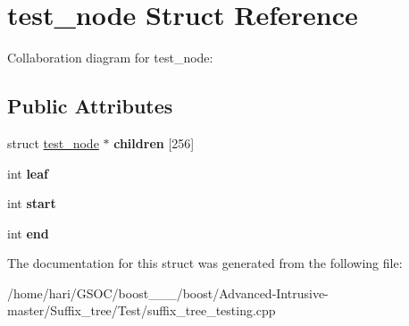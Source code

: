 \hypertarget{structtest__node}{}\section{test\+\_\+node Struct Reference}
\label{structtest__node}


Collaboration diagram for test\+\_\+node\+:
\subsection*{Public Attributes}
\begin{DoxyCompactItemize}
\item 
\mbox{\label{structtest__node_a78159a40a964a54f7abeb4cef896fcc2}} 
struct \hyperlink{structtest__node}{test\+\_\+node} $\ast$ {\bfseries children} \mbox{[}256\mbox{]}
\item 
\mbox{\label{structtest__node_a2c46ffd93d63f06a29e2928cee863435}} 
int {\bfseries leaf}
\item 
\mbox{\label{structtest__node_ae97568efab015dc1f2c6c727fb5da6cc}} 
int {\bfseries start}
\item 
\mbox{\label{structtest__node_aa13ec5d5c3800e2afdd0c5f521a1dc0b}} 
int {\bfseries end}
\end{DoxyCompactItemize}


The documentation for this struct was generated from the following file\+:\begin{DoxyCompactItemize}
\item 
/home/hari/\+G\+S\+O\+C/boost\+\_\+\_\+\_/boost/\+Advanced-\/\+Intrusive-\/master/\+Suffix\+\_\+tree/\+Test/suffix\+\_\+tree\+\_\+testing.\+cpp\end{DoxyCompactItemize}
